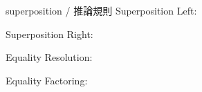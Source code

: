 \documentclass[dvipdfmx,11pt,notheorems]{beamer}
\theoremstyle{definition}
\begin{document}
\begin{frame}{superposition / 推論規則}
  Superposition Left:
  \begin{prooftree}
  \end{prooftree}

  Superposition Right:
  \begin{prooftree}
  \end{prooftree}

  Equality Resolution:
  \begin{prooftree}
  \end{prooftree}

  Equality Factoring:
  \begin{prooftree}
  \end{prooftree}
\end{frame}
\end{document}
